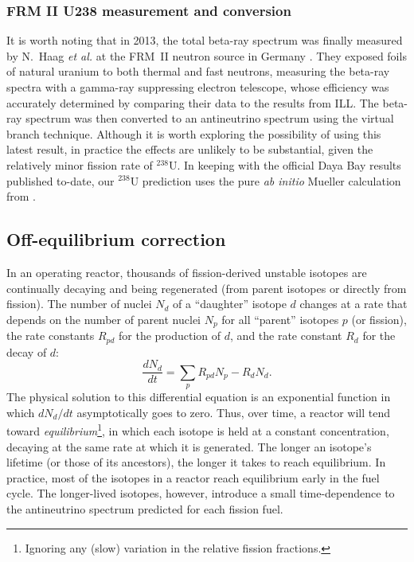 \documentclass[../thesis.tex]{subfiles}
\begin{document}
\subsubsection{FRM II U238 measurement and conversion}
\label{sec:u238conv}

It is worth noting that in 2013, the \ureight total beta-ray spectrum was finally measured by N.~Haag \emph{et al.} at the FRM~II neutron source in Germany \cite{PhysRevLett.112.122501}. They exposed foils of natural uranium to both thermal and fast neutrons, measuring the beta-ray spectra with a gamma-ray suppressing electron telescope, whose efficiency was accurately determined by comparing their \urfive data to the results from ILL. The beta-ray spectrum was then converted to an antineutrino spectrum using the virtual branch technique. Although it is worth exploring the possibility of using this latest result, in practice the effects are unlikely to be substantial, given the relatively minor fission rate of $^{238}$U. In keeping with the official Daya Bay results published to-date, our $^{238}$U prediction uses the pure \emph{ab initio} Mueller calculation from \cite{PhysRevC.83.054615}.

\subsection{Off-equilibrium correction}
\label{sec:offeqcorr}

In an operating reactor, thousands of fission-derived unstable isotopes are continually decaying and being regenerated (from parent isotopes or directly from fission). The number of nuclei $N_d$ of a ``daughter'' isotope $d$ changes at a rate that depends on the number of parent nuclei $N_p$ for all ``parent'' isotopes $p$ (or fission), the rate constants $R_{pd}$ for the production of $d$, and the rate constant $R_d$ for the decay of $d$:
\begin{equation}
  \frac{dN_d}{dt} = \sum_p R_{pd} N_p - R_d N_d.
\end{equation}
The physical solution to this differential equation is an exponential function in which $dN_d/dt$ asymptotically goes to zero. Thus, over time, a reactor will tend toward \emph{equilibrium}\footnote{Ignoring any (slow) variation in the relative fission fractions.}, in which each isotope is held at a constant concentration, decaying at the same rate at which it is generated. The longer an isotope's lifetime (or those of its ancestors), the longer it takes to reach equilibrium. In practice, most of the isotopes in a reactor reach equilibrium early in the fuel cycle. The longer-lived isotopes, however, introduce a small time-dependence to the antineutrino spectrum predicted for each fission fuel.
\end{document}
